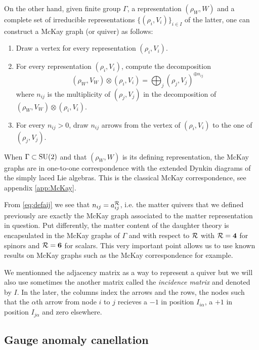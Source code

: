         On the other hand, given finite group $\Gamma$, a representation $(\rho_W,W)$ and a complete set of irreducible representations $\{(\rho_i,V_i)\}_{i\in I}$ of the latter, one can construct a McKay graph (or quiver) as follows:
        \begin{enumerate}
            \item Draw a vertex for every representation $(\rho_i,V_i)$.
            \item For every representation $(\rho_i,V_i)$, compute the decomposition
            \begin{equation*}
                (\rho_W,V_W)\otimes(\rho_i,V_i)=\bigoplus_j (\rho_j,V_j)^{\oplus n_{ij}}
            \end{equation*}
            where $n_{ij}$ is the multiplicity of $(\rho_j,V_j)$ in the decomposition of $(\rho_W,V_W)\otimes(\rho_i,V_i)$.
            \item For every $n_{ij}>0$, draw $n_{ij}$ arrows from the vertex of $(\rho_i,V_i)$ to the one of $(\rho_j,V_j)$.
        \end{enumerate}
        When $\Gamma\subset\text{SU}(2)$ and that $(\rho_W,W)$ is its defining representation, the McKay graphs are in one-to-one correspondence with the extended Dynkin diagrams of the simply laced Lie algebras. This is the classical McKay correspondence, see appendix \ref{app:McKay}.
        
        From \eqref{eq:defaij} we see that $n_{ij}=a^{\mathcal{R}}_{ij}$, i.e. the matter quivers that we defined previously are exactly the McKay graph associated to the matter representation in question. Put differently, the matter content of the daughter theory is encapsulated in the McKay graphs of $\Gamma$ and with respect to $\mathcal{R}$ with $\mathcal{R}=\boldsymbol{4}$ for spinors and $\mathcal{R}=\boldsymbol{6}$ for scalars. This very important point allows us to use known results on McKay graphs such as the McKay correspondence for example.

        We mentionned the adjacency matrix as a way to represent a quiver but we will also use sometimes the another matrix called the \emph{incidence matrix} and denoted by $I$. In the later, the columns index the arrows and the rows, the nodes such that the $\alpha$th arrow from node $i$ to $j$ recieves a $-1$ in position $I_{i\alpha}$, a $+1$ in position $I_{j\alpha}$ and zero elsewhere.

    \subsection{Gauge anomaly canellation}

